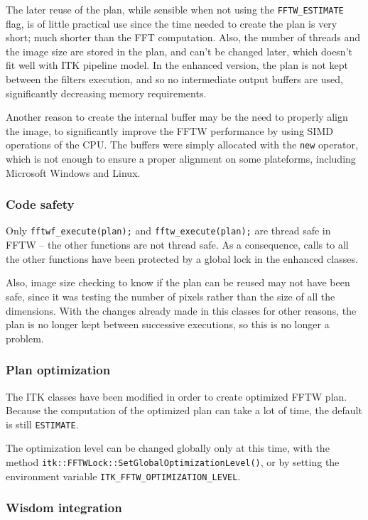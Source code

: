 \documentclass{InsightArticle}
\begin{document}
The later reuse of the plan, while sensible when not using the \verb$FFTW_ESTIMATE$ flag, is of little practical use
since the time needed to create the plan is very short; much shorter than the
FFT computation. Also, the number of threads and the image size are stored in the plan, and can't be 
changed later, which doesn't fit well with ITK pipeline model. In the enhanced version, the plan is
not kept between the filters execution, and so no intermediate output buffers are used,
significantly decreasing memory requirements.

Another reason to create the internal buffer may be the need to properly align the image, to significantly
improve the FFTW performance by using SIMD operations of the CPU. The buffers were simply allocated with the
\verb$new$ operator, which is not enough to ensure a proper alignment
on some plateforms, including Microsoft Windows and Linux.


\subsubsection{Code safety}

Only \verb$fftwf_execute(plan);$ and \verb$fftw_execute(plan);$ are thread safe in FFTW -- the other functions
are not thread safe. As a consequence, calls to all the other functions have been protected by a 
global lock in the enhanced classes.

Also, image size checking to know if the plan can be reused may not have been safe,
since it was testing the number of pixels rather than the size of all the dimensions. 
With the changes already made in this classes for other reasons, the plan is no longer kept
between successive executions, so this is no longer a problem.

\subsubsection{Plan optimization}

The ITK classes have been modified in order to create optimized FFTW plan. Because the computation
of the optimized plan can take a lot of time, the default is still \verb$ESTIMATE$.

The optimization level can be changed globally only at this time, with the method
\verb$itk::FFTWLock::SetGlobalOptimizationLevel()$, or by setting the environment variable
\verb$ITK_FFTW_OPTIMIZATION_LEVEL$.

\subsubsection{Wisdom integration}
\end{document}

